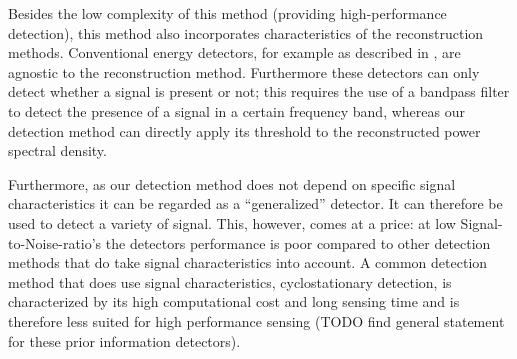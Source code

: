 \documentclass[a4paper, openany, oneside]{memoir}
\begin{document}
Besides the low complexity of this method  (providing high-performance detection), this method also incorporates characteristics of the reconstruction methods. Conventional energy detectors, for example as described in \cite{???}, are agnostic to the reconstruction method. Furthermore these detectors can only detect whether a signal is present or not; this requires the use of a bandpass filter to detect the presence of  a signal in a certain frequency band, whereas our detection method can directly apply its threshold to the reconstructed power spectral density.

Furthermore, as our detection method does not depend on specific signal characteristics it can be regarded as a ``generalized'' detector. It can therefore be used to detect a variety of signal. This, however, comes at a price: at low Signal-to-Noise-ratio's the detectors performance is poor \cite{???} compared to other detection methods that do take signal characteristics into account. A common detection method that does use signal characteristics, cyclostationary detection, is characterized by its high computational cost and long sensing time and is therefore less suited for high performance sensing (TODO find general statement for these prior information detectors). 

\end{document}
